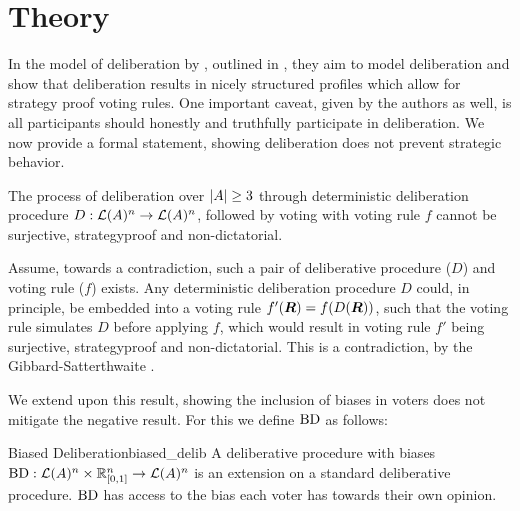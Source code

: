 \newpage \chapter{Theory} \label{theory}


In the model of deliberation by
\citet{radDeliberationSinglePeakednessCoherent2021}, outlined in
, they aim to model deliberation and show that
deliberation results in nicely structured profiles which allow for strategy
proof voting rules. One important caveat, given by the authors as well, is all
participants should honestly and truthfully participate in deliberation. We now
provide a formal statement, showing deliberation does not prevent strategic
behavior.

\begin{proposition} The process of deliberation over $|A| \geq 3$
	through deterministic deliberation procedure \({D}:
	\mathcal{L}(A)^n \to \mathcal{L}(A)^n\), followed by voting
	with voting rule $f$ cannot be surjective, strategyproof and
	non-dictatorial.

	\label{proposition:deterministic-delib} \end{proposition}

\begin{proofc} Assume, towards a contradiction, such a pair of deliberative
	procedure ($D$) and voting rule (\(f\)) exists. Any deterministic deliberation
	procedure $D$ could, in principle, be embedded into a voting rule
	$f'(\boldsymbol{R}) = f(D(\boldsymbol{R}))$, such that the voting rule
	simulates $D$ before applying $f$, which would result in  voting rule $f'$
	being surjective, strategyproof and non-dictatorial. This is a contradiction,
	by the Gibbard-Satterthwaite
	.
\end{proofc}


We extend upon this result, showing the inclusion of biases in voters does not
mitigate the negative result. For this we define $\operatorname{BD}$ as
follows:

\begin{definition}{Biased Deliberation}{biased_delib} A deliberative procedure
	with biases $\operatorname{BD} : \mathcal{L}(A) ^ n \times
		\mathbb{R}_{[0,1]}^n \to \mathcal{L}(A)^n$ is an extension on a
	standard deliberative procedure. \(\operatorname{BD}\) has access to
	the bias each voter has towards their own opinion. \end{definition}

